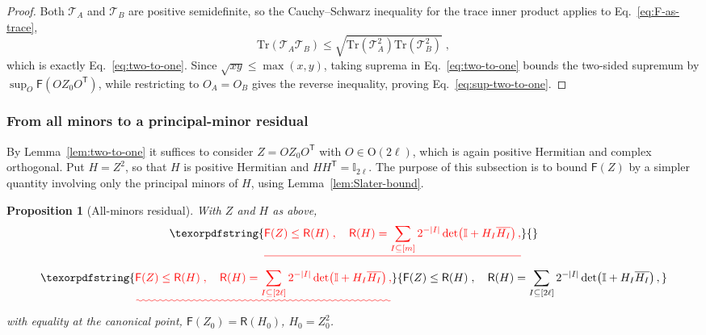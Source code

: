 \documentclass[prx,twocolumn,superscriptaddress,aps,10pt, frontmatterverbose, reprint,footinbib,longbibliography=true]{revtex4-2}
\newtheorem{proposition}{Proposition}
\newcommand{\trans}{\mathsf{T}}
\providecommand{\DIFaddtex}[1]{{\protect\color{red}\uwave{#1}}} %
\providecommand{\DIFdeltex}[1]{{\protect\color{red}\sout{#1}}}                      %
\providecommand{\DIFaddbegin}{\protect\color{red}} %
\providecommand{\DIFaddend}{\protect\color{black}} %
\providecommand{\DIFdelbegin}{} %
\providecommand{\DIFdelend}{} %
\providecommand{\DIFadd}[1]{\texorpdfstring{\DIFaddtex{#1}}{#1}} %
\providecommand{\DIFdel}[1]{\texorpdfstring{\DIFdeltex{#1}}{}} %
\newcommand{\DIFscaledelfig}{0.5}
\newlength{\DIFdelgraphicswidth} %
\newlength{\DIFdelgraphicsheight} %
\newcommand{\DIFaddincludegraphics}[2][]{{\color{blue}\fbox{\DIFOincludegraphics[#1]{#2}}}} %
\newcommand{\DIFdelincludegraphics}[2][]{%
\sbox{\DIFdelgraphicsbox}{\DIFOincludegraphics[#1]{#2}}%
\settoboxwidth{\DIFdelgraphicswidth}{\DIFdelgraphicsbox} %
\settoboxtotalheight{\DIFdelgraphicsheight}{\DIFdelgraphicsbox} %
\scalebox{\DIFscaledelfig}{%
\parbox[b]{\DIFdelgraphicswidth}{\usebox{\DIFdelgraphicsbox}\\[-\baselineskip] \rule{\DIFdelgraphicswidth}{0em}}\llap{\resizebox{\DIFdelgraphicswidth}{\DIFdelgraphicsheight}{%
\setlength{\unitlength}{\DIFdelgraphicswidth}%
\begin{picture}(1,1)%
\thicklines\linethickness{2pt} %
{\color[rgb]{1,0,0}\put(0,0){\framebox(1,1){}}}%
{\color[rgb]{1,0,0}\put(0,0){\line( 1,1){1}}}%
{\color[rgb]{1,0,0}\put(0,1){\line(1,-1){1}}}%
\end{picture}%
}\hspace*{3pt}}} %
} %
\DeclareRobustCommand{\DIFaddbegin}{\DIFOaddbegin \let\includegraphics\DIFaddincludegraphics} %
\DeclareRobustCommand{\DIFaddend}{\DIFOaddend \let\includegraphics\DIFOincludegraphics} %
\DeclareRobustCommand{\DIFdelbegin}{\DIFOdelbegin \let\includegraphics\DIFdelincludegraphics} %
\DeclareRobustCommand{\DIFdelend}{\DIFOaddend \let\includegraphics\DIFOincludegraphics} %
\begin{document}
\begin{proof}
Both $\mathcal{T}_A$ and $\mathcal{T}_B$ are positive semidefinite, so the Cauchy--Schwarz inequality for the trace inner product applies to Eq.~\eqref{eq:F-as-trace},
\begin{equation}
    \mathrm{Tr}\!\left(\mathcal{T}_A\mathcal{T}_B\right)\le\sqrt{\mathrm{Tr}\!\left(\mathcal{T}_A^2\right)\mathrm{Tr}\!\left(\mathcal{T}_B^2\right)}\;,
\end{equation}
which is exactly Eq.~\eqref{eq:two-to-one}. Since $\sqrt{xy}\le\max(x,y)$, taking suprema in Eq.~\eqref{eq:two-to-one} bounds the two-sided supremum by $\sup_O\mathsf{F}(OZ_0O^{\trans})$, while restricting to $O_A=O_B$ gives the reverse inequality, proving Eq.~\eqref{eq:sup-two-to-one}.
\end{proof}


\subsubsection{From all minors to a principal-minor residual}
\label{app:proof:residual}

By Lemma~\ref{lem:two-to-one} it suffices to consider $Z=OZ_0O^{\trans}$ with $O\in\mathrm{O}(2\ell)$,  which is again positive Hermitian and complex orthogonal. Put $H=Z^2$, so that $H$ is positive Hermitian and $HH^{\trans}=\mathbb{I}_{2\ell}$.
The purpose of this subsection is to bound $\mathsf{F}(Z)$ by a simpler quantity involving only the principal minors of $H$, using Lemma~\ref{lem:Slater-bound}.
\begin{proposition}[All-minors residual]
\label{prop:residual}
With $Z$ and $H$ as above,
\DIFdelbegin \begin{displaymath}
    \DIFdel{\mathsf{F}(Z)\le \mathsf{R}(H)\;,\quad \mathsf{R}(H)=\sum_{I\subseteq[m]}2^{-|I|}\det\!\left(\mathbb{I}+H_I\overline{H_I}\right),
}\end{displaymath}%
\DIFdelend \DIFaddbegin \begin{equation}
    \DIFadd{\mathsf{F}(Z)\le \mathsf{R}(H)\;,\quad \mathsf{R}(H)=\sum_{I\subseteq[2\ell]}2^{-|I|}\det\!\left(\mathbb{I}+H_I\overline{H_I}\right),
    \label{eq:R-definition}
}\end{equation}\DIFaddend 
with equality at the canonical point, $\mathsf{F}(Z_0)=\mathsf{R}(H_0)$, $H_0=Z_0^2$.
\end{proposition}
\end{document}

